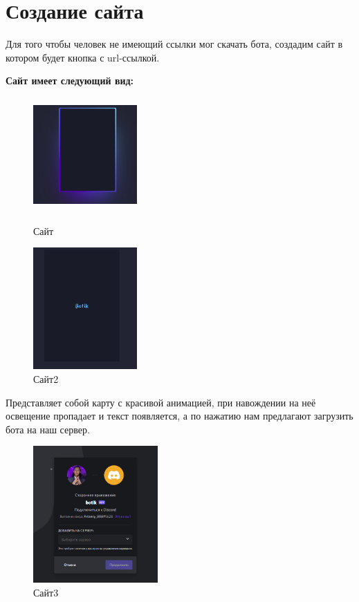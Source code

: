 \documentclass[a4paper,12pt]{article}
\begin{document}
\section{Создание сайта}
Для того чтобы человек не имеющий ссылки мог скачать бота, создадим сайт в котором будет кнопка с url-ссылкой.
\begin{center}
\textbf{Сайт имеет следующий вид:}
\end{center}
    \begin{figure}[h!]
    \centering
    \begin{minipage}[b]{0.4\textwidth}
    \includegraphics[width = 150px,height = 165px]{pictures/Site.png}
    \caption{Сайт}
    \label{fig:my_label19}
    \end{minipage}
    \hfill
    \begin{minipage}[b]{0.4\textwidth}
    \includegraphics[width = 150px]{pictures/site2.png}
    \caption{Сайт2}
    \label{fig:my_label20}
    \end{minipage}
    \end{figure}
Представляет собой карту с красивой анимацией, при навождении на неё освещение пропадает и текст появляется, а по нажатию нам предлагают загрузить бота на наш сервер.
    \begin{figure}[h]
    \centering
    \includegraphics[width = 180px]{pictures/linklink.png}
    \caption{Сайт3}
    \label{fig:my_label21}
    \end{figure}
\end{document}
